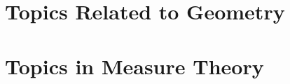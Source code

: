 \documentclass{tufte-book}
\begin{document}
\chapter{Topics Related to Geometry}
\clearpage







\chapter{Topics in Measure Theory}
\clearpage



\printindex
\end{document}
